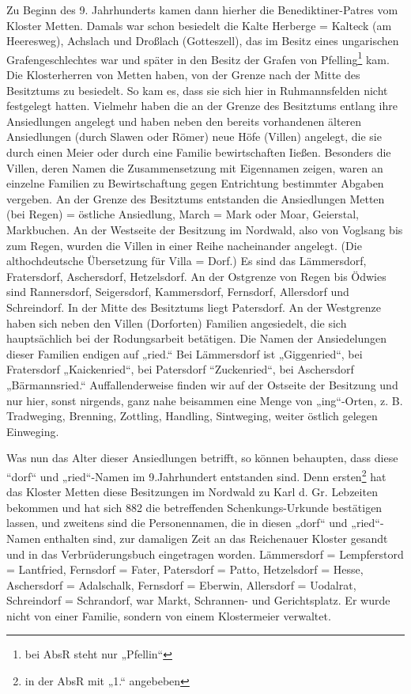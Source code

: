 \documentclass[12pt,a4paper]{book}
\begin{document}
Zu Beginn des 9. Jahrhunderts kamen dann hierher die Benediktiner-Patres
vom Kloster Metten. Damals war schon besiedelt die Kalte Herberge =
Kalteck (am Heeresweg), Achslach und Droßlach (Gotteszell), das im
Besitz eines ungarischen Grafengeschlechtes war und später in den Besitz
der Grafen von Pfelling\footnote{bei AbsR steht nur „Pfellin“} kam. Die
Klosterherren von Metten haben, von der Grenze nach der Mitte des
Besitztums zu besiedelt. So kam es, dass sie sich hier in Ruhmannsfelden
nicht festgelegt hatten. Vielmehr haben die an der Grenze des Besitztums
entlang ihre Ansiedlungen angelegt und haben neben den bereits
vorhandenen älteren Ansiedlungen (durch Slawen oder Römer) neue Höfe
(Villen) angelegt, die sie durch einen Meier oder durch eine Familie
bewirtschaften Iießen. Besonders die Villen, deren Namen die
Zusammensetzung mit Eigennamen zeigen, waren an einzelne Familien zu
Bewirtschaftung gegen Entrichtung bestimmter Abgaben vergeben. An der
Grenze des Besitztums entstanden die Ansiedlungen Metten (bei Regen) =
östliche Ansiedlung, March = Mark oder Moar, Geierstal, Markbuchen. An
der Westseite der Besitzung im Nordwald, also von Voglsang bis zum
Regen, wurden die Villen in einer Reihe nacheinander angelegt. (Die
althochdeutsche Übersetzung für Villa = Dorf.) Es sind das Lämmersdorf,
Fratersdorf, Aschersdorf, Hetzelsdorf. An der Ostgrenze von Regen bis
Ödwies sind Rannersdorf, Seigersdorf, Kammersdorf, Fernsdorf, Allersdorf
und Schreindorf. In der Mitte des Besitztums liegt Patersdorf. An der
Westgrenze haben sich neben den Villen (Dorforten) Familien angesiedelt,
die sich hauptsächlich bei der Rodungsarbeit betätigen. Die Namen der
Ansiedelungen dieser Familien endigen auf „ried.“ Bei Lämmersdorf ist
„Giggenried“, bei Fratersdorf „Kaickenried“, bei Patersdorf
“Zuckenried“, bei Aschersdorf „Bärmannsried.“ Auffallenderweise finden
wir auf der Ostseite der Besitzung und nur hier, sonst nirgends, ganz
nahe beisammen eine Menge von „ing“-Orten, z. B. Tradweging, Brenning,
Zottling, Handling, Sintweging, weiter östlich gelegen Einweging.

Was nun das Alter dieser Ansiedlungen betrifft, so können behaupten,
dass diese “dorf“ und „ried“-Namen im 9.Jahrhundert entstanden sind.
Denn ersten\footnote{in der AbsR mit „1.“ angebeben} hat das Kloster
Metten diese Besitzungen im Nordwald zu Karl d. Gr. Lebzeiten bekommen
und hat sich 882 die betreffenden Schenkungs-Urkunde bestätigen lassen,
und zweitens sind die Personennamen, die in diesen „dorf“ und
„ried“-Namen enthalten sind, zur damaligen Zeit an das Reichenauer
Kloster gesandt und in das Verbrüderungsbuch eingetragen worden.
Lämmersdorf = Lempferstord = Lantfried, Fernsdorf = Fater, Patersdorf =
Patto, Hetzelsdorf = Hesse, Aschersdorf = Adalschalk, Fernsdorf =
Eberwin, Allersdorf = Uodalrat, Schreindorf = Schrandorf, war Markt,
Schrannen- und Gerichtsplatz. Er wurde nicht von einer Familie, sondern
von einem Klostermeier verwaltet.
\end{document}
